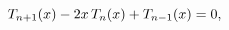 \[\mathop{T_{n+1}\/}\nolimits\!\left(x\right)-2x\mathop{T_{n}\/}\nolimits\!\left%
(x\right)+\mathop{T_{n-1}\/}\nolimits\!\left(x\right)=0,\]
